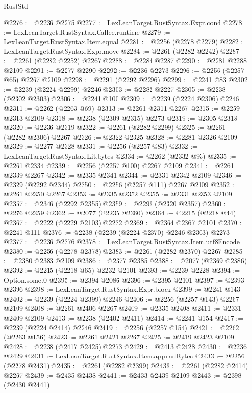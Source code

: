\begin{lexlean}{RustStd}
\begin{coremodule}
@2276 := @2236 @2275
@2277 := LexLeanTarget.RustSyntax.Expr.cond
@2278 := LexLeanTarget.RustSyntax.Callee.runtime
@2279 := LexLeanTarget.RustSyntax.Item.equal
@2281 := @2256 (@2278 @2279)
@2282 := LexLeanTarget.RustSyntax.Expr.move
@2284 := @2261 (@2282 @2242)
@2287 := @2261 (@2282 @2252) @2267
@2288 := @2284 @2287
@2290 := @2281 @2288 @2109
@2291 := @2277 @2290
@2292 := @2236 @2273
@2296 := @2256 (@2257 @65) @2267 @2109
@2298 := @2291 (@2292 @2296)
@2299 := @2241 @83
@2302 := @2239 (@2224 @2299) @2246
@2303 := @2282 @2227
@2305 := @2238 (@2302 @2303)
@2306 := @2241 @100
@2309 := @2239 (@2224 @2306) @2246
@2311 := @2262 (@2263 @69)
@2313 := @2261 @2311 @2267
@2315 := @2259 @2313 @2109
@2318 := @2238 (@2309 @2315) @2273
@2319 := @2305 @2318
@2320 := @2236 @2319
@2322 := @2261 (@2282 @2299)
@2325 := @2261 (@2282 @2306) @2267
@2326 := @2322 @2325
@2328 := @2281 @2326 @2109
@2329 := @2277 @2328
@2331 := @2256 (@2257 @83)
@2332 := LexLeanTarget.RustSyntax.Lit.bytes
@2334 := @2262 (@2332 @93)
@2335 := @2261 @2334
@2339 := @2256 (@2257 @100) @2267 @2109
@2341 := @2261 @2339 @2267
@2342 := @2335 @2341
@2344 := @2331 @2342 @2109
@2346 := @2329 (@2292 @2344)
@2350 := @2256 (@2257 @111) @2267 @2109
@2352 := @2261 @2350 @2267
@2353 := @2335 @2352
@2355 := @2331 @2353 @2109
@2357 := @2346 (@2292 @2355)
@2359 := @2298 (@2320 @2357)
@2360 := @2276 @2359
@2362 := @2077 (@2235 @2360)
@2364 := @2215 (@2218 @44)
@2367 := @2222 (@2229 @2103) @2232
@2369 := @2364 @2367 @2101
@2370 := @2241 @111
@2376 := @2238 (@2239 (@2224 @2370) @2246 @2303) @2273
@2377 := @2236 @2376
@2378 := LexLeanTarget.RustSyntax.Item.utf8Encode
@2380 := @2256 (@2278 @2378)
@2383 := @2261 (@2282 @2370) @2267
@2385 := @2380 @2383 @2109
@2386 := @2377 @2385
@2388 := @2077 (@2369 @2386)
@2392 := @2215 (@2218 @65) @2232 @2101
@2393 := @2239 @2228
@2394 := Option.some.{0}
@2395 := @2394 @2086
@2396 := @2395 @2101
@2397 := @2393 @2396
@2398 := LexLeanTarget.RustSyntax.Expr.block
@2399 := @2241 @143
@2402 := @2239 (@2224 @2399) @2246
@2406 := @2256 (@2257 @143) @2267 @2109
@2408 := @2261 @2406 @2267
@2409 := @2335 @2408
@2411 := @2331 @2409 @2109
@2413 := @2238 (@2402 @2411)
@2414 := @2241 @154
@2417 := @2239 (@2224 @2414) @2246
@2419 := @2256 (@2257 @154)
@2421 := @2262 (@2263 @156)
@2423 := @2261 @2421 @2267
@2425 := @2419 @2423 @2109
@2428 := @2238 (@2417 @2425) @2273
@2429 := @2413 @2428
@2430 := @2236 @2429
@2431 := LexLeanTarget.RustSyntax.Item.appendBytes
@2433 := @2256 (@2278 @2431)
@2435 := @2261 (@2282 @2399)
@2438 := @2261 (@2282 @2414) @2267
@2439 := @2435 @2438
@2441 := @2433 @2439 @2109
@2443 := @2398 (@2430 @2441)

\end{coremodule}
\end{lexlean}
